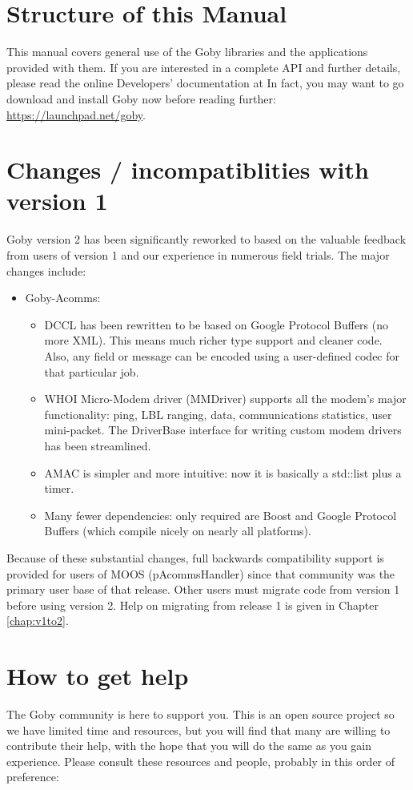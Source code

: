 \section{Structure of this Manual}
This manual covers general use of the Goby libraries and the applications provided with them. If you are interested in a complete API and further details, please read the online Developers' documentation at \cite{goby-doc} In fact, you may want to go download and install Goby now before reading further: \url{https://launchpad.net/goby}.

\section{Changes / incompatiblities with version 1}

Goby version 2 has been significantly reworked to based on the valuable feedback from users of version 1 and our experience in numerous field trials.
 The major changes include:
\begin{itemize}
\item Goby-Acomms:
\begin{itemize}
\item DCCL has been rewritten to be based on Google Protocol Buffers (no more XML). This means much richer type support and cleaner code. Also,
any field or message can be encoded using a user-defined codec for that particular job.
\item WHOI Micro-Modem driver (MMDriver) supports all the modem's major functionality: ping, LBL ranging, data, communications statistics, user mini-packet. The DriverBase interface for writing custom modem drivers has been streamlined.
\item AMAC is simpler and more intuitive: now it is basically a std::list plus a timer.
\item Many fewer dependencies: only required are Boost and Google Protocol Buffers (which compile nicely on nearly all platforms).
\end{itemize}
\end{itemize}

Because of these substantial changes, full backwards compatibility support is provided for users of MOOS (pAcommsHandler) since that community was the primary user base of that release. Other users must migrate code from version 1 before using version 2. Help on migrating from release 1 is given in Chapter \ref{chap:v1to2}.

\section{How to get help}
The Goby community is here to support you. This is an open source project so we have limited time and resources, but you will find that many are willing to contribute their help, with the hope that you will do the same as you gain experience. Please consult these resources and people, probably in this order of preference:

